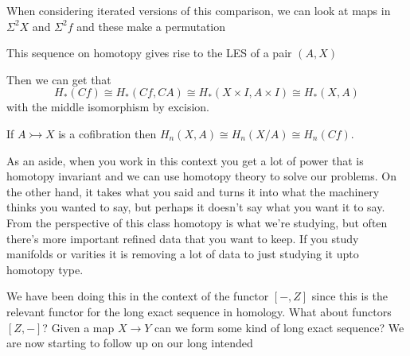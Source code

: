 \documentclass[10pt]{article}
\theoremstyle{definition}
\begin{document}
	When considering iterated versions of this comparison, we can look at maps in $\Sigma^2 X$ and $\Sigma^2 f$ and these make a permutation
	\begin{center}
		\end{center}
	This sequence on homotopy gives rise to the LES of a pair $(A,X)$
	\begin{center}
	\end{center}
	Then we can get that \[
	H_*(Cf)\cong H_*(Cf,CA)\cong H_*(X\times I, A\times I)\cong H_*(X,A)
	\]
	with the middle isomorphism by excision. 
	
	If $A\rightarrowtail X$ is a cofibration then $H_n(X,A)\cong H_n(X/A)\cong H_n(Cf)$. 
	
	As an aside, when you work in this context you get a lot of power that is homotopy invariant and we can use homotopy theory to solve our problems. On the other hand, it takes what you said and turns it into what the machinery thinks you wanted to say, but perhaps it doesn't say what you want it to say. From the perspective of this class homotopy is what we're studying, but often there's more important refined data that you want to keep. If you study manifolds or varities it is removing a lot of data to just studying it upto homotopy type. 
	
	We have been doing this in the context of the functor $[-,Z]$ since this is the relevant functor for the long exact sequence in homology. What about functors $[Z,-]$? Given a map $X\to Y$ can we form some kind of long exact sequence? We are now starting to follow up on our long intended 
	
\end{document}
